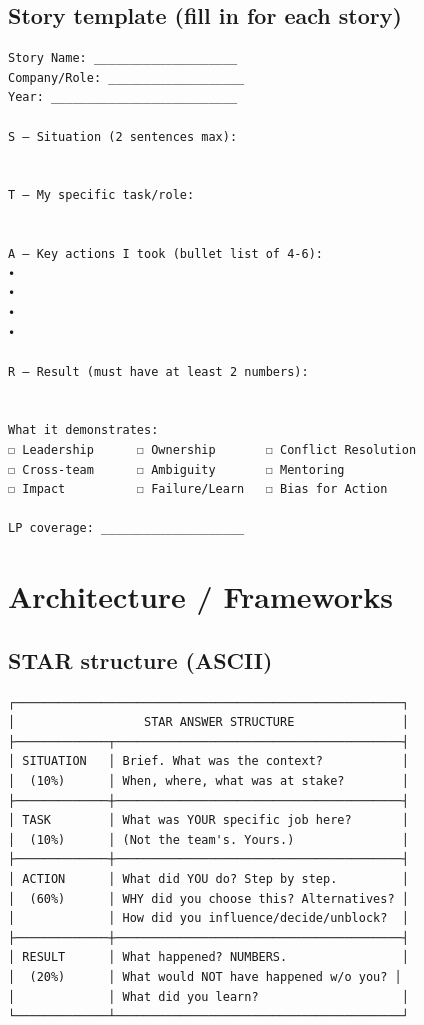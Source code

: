 \documentclass[11pt]{article}
\begin{document}
\subsection{Story template (fill in for each story)}\label{story-template-fill-in-for-each-story}

\setcodelang{}

\begin{verbatim}
Story Name: ____________________
Company/Role: ___________________
Year: __________________________

S — Situation (2 sentences max):


T — My specific task/role:


A — Key actions I took (bullet list of 4-6):
• 
• 
• 
• 

R — Result (must have at least 2 numbers):


What it demonstrates:
☐ Leadership      ☐ Ownership       ☐ Conflict Resolution
☐ Cross-team      ☐ Ambiguity       ☐ Mentoring
☐ Impact          ☐ Failure/Learn   ☐ Bias for Action

LP coverage: ____________________
\end{verbatim}

\section{Architecture / Frameworks}\label{architecture--frameworks}

\subsection{STAR structure (ASCII)}\label{star-structure-ascii}

\setcodelang{}

\begin{verbatim}
┌──────────────────────────────────────────────────────┐
│                  STAR ANSWER STRUCTURE               │
├─────────────┬────────────────────────────────────────┤
│ SITUATION   │ Brief. What was the context?           │
│  (10%)      │ When, where, what was at stake?        │
├─────────────┼────────────────────────────────────────┤
│ TASK        │ What was YOUR specific job here?       │
│  (10%)      │ (Not the team's. Yours.)               │
├─────────────┼────────────────────────────────────────┤
│ ACTION      │ What did YOU do? Step by step.         │
│  (60%)      │ WHY did you choose this? Alternatives? │
│             │ How did you influence/decide/unblock?  │
├─────────────┼────────────────────────────────────────┤
│ RESULT      │ What happened? NUMBERS.                │
│  (20%)      │ What would NOT have happened w/o you? │
│             │ What did you learn?                    │
└─────────────┴────────────────────────────────────────┘
\end{verbatim}
\end{document}
